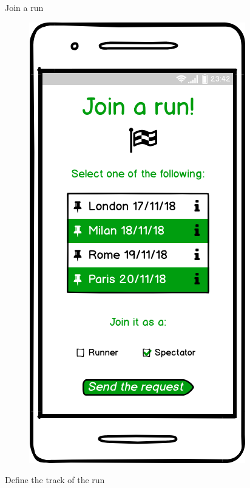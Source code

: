 \documentclass{article}
\begin{document}
\begin{legal}
\begin{legal}
\begin{legal}
{\begin{legal}
\begin{figure}[H]
						\end{figure}
					\item Join a run 
						\begin{figure}[H]
						\centering
  						\includegraphics[scale=0.3]{./images/mockups/Join-a-run.png}
						\end{figure}
					\item Define the track of the run 
						\begin{figure}[H]
						\centering

\end{figure}
\end{legal}}
\end{legal}
\end{legal}
\end{legal}
\end{document}
